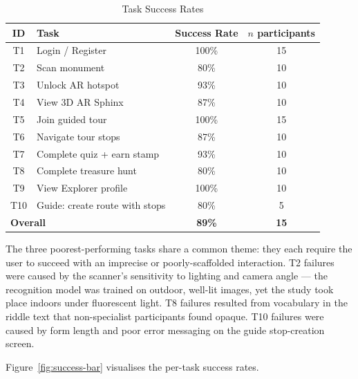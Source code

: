\begin{table}[htbp]
  \centering
  \caption{Task Success Rates}
  \label{tab:success}
  \begin{tabular}{clcc}
    \toprule
    \textbf{ID} & \textbf{Task}                    & \textbf{Success Rate} &
    \textbf{$n$ participants} \\
    \midrule
    T1  & Login / Register                  & 100\% & 15 \\
    T2  & Scan monument                     &  80\% & 10 \\
    T3  & Unlock AR hotspot                 &  93\% & 10 \\  %
    T4  & View 3D AR Sphinx                 &  87\% & 10 \\
    T5  & Join guided tour                  & 100\% & 15 \\
    T6  & Navigate tour stops               &  87\% & 10 \\
    T7  & Complete quiz + earn stamp        &  93\% & 10 \\
    T8  & Complete treasure hunt            &  80\% & 10 \\
    T9  & View Explorer profile             & 100\% & 10 \\
    T10 & Guide: create route with stops    &  80\% &  5 \\
    \midrule
    \multicolumn{2}{l}{\textbf{Overall}}    & \textbf{89\%} & \textbf{15} \\
    \bottomrule
  \end{tabular}
\end{table}

The three poorest-performing tasks share a common theme: they each require the user to
succeed with an imprecise or poorly-scaffolded interaction. T2 failures were caused by
the scanner's sensitivity to lighting and camera angle — the recognition model was
trained on outdoor, well-lit images, yet the study took place indoors under fluorescent
light. T8 failures resulted from vocabulary in the riddle text that non-specialist
participants found opaque. T10 failures were caused by form length and poor error
messaging on the guide stop-creation screen.

Figure~\ref{fig:success-bar} visualises the per-task success rates.

